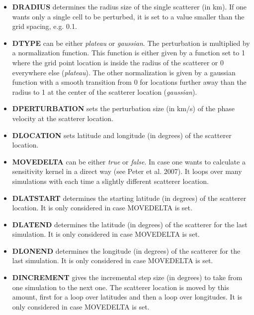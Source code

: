 \documentclass[a4paper,
                          headsepline,
                          listof=totoc,
                          toc=listof,
                          headings=small]{scrreprt} %
\begin{document}
\begin{itemize}
\item \textbf{DRADIUS}
determines the radius size of the single scatterer (in km). If one wants only a single cell
to be perturbed, it is set to a value smaller than the grid spacing, e.g. 0.1.

\item \textbf{DTYPE}
can be either \textit{plateau} or \textit{gaussian}. The perturbation is multiplied by
a normalization function. This function is either given by
a function set to 1 where the grid point location is inside the radius of the scatterer
or 0 everywhere else (\textit{plateau}). The other normalization is given by a gaussian function with a smooth transition from 0 for locations further away
than the radius to 1 at the center of the scatterer location (\textit{gaussian}).

\item \textbf{DPERTURBATION}
sets the perturbation size (in km/s) of the phase velocity at the scatterer location.

\item \textbf{DLOCATION}
sets latitude and longitude (in degrees) of the scatterer location.


\item \textbf{MOVEDELTA}
can be either \textit{true} or \textit{false}. In case one wants to calculate a sensitivity kernel
in a direct way (see Peter et al. 2007). It loops over many simulations
with each time a slightly different scatterer location.

\item \textbf{DLATSTART}
determines the starting latitude (in degrees) of the scatterer location. It is only
considered in case MOVEDELTA is set.

\item \textbf{DLATEND}
determines the latitude (in degrees) of the scatterer for the last simulation. It is only considered in case MOVEDELTA is set.

\item \textbf{DLONEND}
determines the longitude (in degrees) of the scatterer for the last simulation. It is
only considered in case MOVEDELTA is set.

\item \textbf{DINCREMENT}
gives the incremental step size (in degrees) to take from one simulation
to the next one. The scatterer location is moved by this amount, first for a
loop over latitudes and then a loop over longitudes. It is only considered in case MOVEDELTA is set.


\end{itemize}
\end{document}
